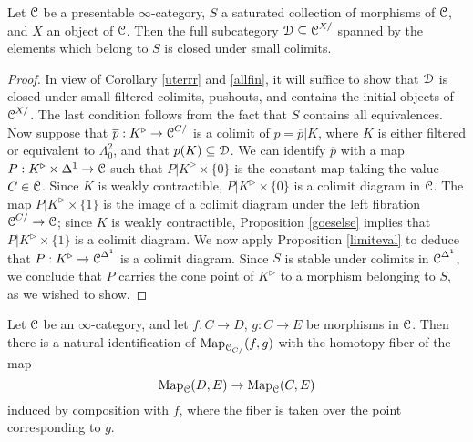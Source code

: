 \begin{lemma}\label{sweetyork}
Let $\operatorname{\mathcal{C}}$ be a presentable $\infty$-category, $S$ a saturated collection of morphisms of $\operatorname{\mathcal{C}}$, and $X$ an object of $\operatorname{\mathcal{C}}$. Then the full subcategory $\operatorname{\mathcal{D}} \subseteq \operatorname{\mathcal{C}}^{X/}$ spanned by the elements which belong to $S$ is closed under small colimits.
\end{lemma}

\begin{proof}
In view of Corollary \ref{uterrr} and \ref{allfin}, it will suffice to show that
$\operatorname{\mathcal{D}}$ is closed under small filtered colimits, pushouts, and contains the initial objects
of $\operatorname{\mathcal{C}}^{X/}$. The last condition follows from the fact that $S$ contains all equivalences.
Now suppose that $\overline{p}: K^{\triangleright} \rightarrow \operatorname{\mathcal{C}}^{C/}$
is a colimit of $p = \overline{p} | K$, where $K$ is either filtered or equivalent to $\Lambda^2_0$,
and that $p(K) \subseteq \operatorname{\mathcal{D}}$. We can identify $\overline{p}$ with a map
$P: K^{\triangleright} \times \Delta^1 \rightarrow \operatorname{\mathcal{C}}$ such that
$P | K^{\triangleright} \times \{0\}$ is the constant map taking the value $C \in \operatorname{\mathcal{C}}$.
Since $K$ is weakly contractible, $P | K^{\triangleright} \times \{0\}$ is a colimit diagram in $\operatorname{\mathcal{C}}$.
The map $P | K^{\triangleright} \times \{1\}$ is the image of a colimit diagram under the left
fibration $\operatorname{\mathcal{C}}^{C/} \rightarrow \operatorname{\mathcal{C}}$; since $K$ is weakly contractible, Proposition \ref{goeselse} implies that $P | K^{\triangleright} \times \{1\}$ is a colimit diagram. We now apply
Proposition \ref{limiteval} to deduce that
$P: K^{\triangleright} \rightarrow \operatorname{\mathcal{C}}^{\Delta^1}$ is a colimit diagram. Since $S$ is stable under colimits in $\operatorname{\mathcal{C}}^{\Delta^1}$, we conclude that $P$
carries the cone point of $K^{\triangleright}$ to a morphism belonging to $S$, as we wished to show.
\end{proof}

\begin{lemma}\label{sugarplace}
Let $\operatorname{\mathcal{C}}$ be an $\infty$-category, and let $f: C \rightarrow D$, $g: C \rightarrow E$ be morphisms in $\operatorname{\mathcal{C}}$. Then there is a natural identification of $\operatorname{{Map}}_{\operatorname{\mathcal{C}}_{C/}}(f,g)$ with
the homotopy fiber of the map
$$ \operatorname{{Map}}_{\operatorname{\mathcal{C}}}(D,E) \rightarrow \operatorname{{Map}}_{\operatorname{\mathcal{C}}}(C,E)$$
induced by composition with $f$, where the fiber is taken over the point corresponding to $g$.
\end{lemma}

